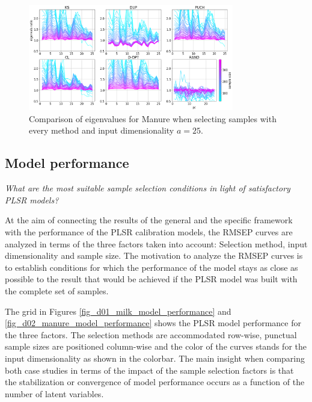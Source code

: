 \documentclass[journal=ancham,manuscript=article]{achemso}
\begin{document}
\begin{figure}[b]
\includegraphics[width=0.8\textwidth]{manuscript/figures/d02_manure_specific_framework_eigenvalsratio.png}
\centering
\caption{Comparison of eigenvalues for Manure when selecting samples with every method and input dimensionality $a=25$.}
\label{fig_d02_manure_specific_framework_eigenvalsratio}
\end{figure}

\subsection*{Model performance}\label{results:modperformance}


\emph{What are the most suitable sample selection conditions in light of satisfactory PLSR models?}

At the aim of connecting the results of the general and the specific framework with the performance of the PLSR calibration models, the RMSEP curves are analyzed in terms of the three factors taken into account: Selection method, input dimensionality and sample size. The motivation to analyze the RMSEP curves is to establish conditions for which the performance of the model stays as close as possible to the result that would be achieved if the PLSR model was built with the complete set of samples. 

The grid in Figures \ref{fig_d01_milk_model_performance} and \ref{fig_d02_manure_model_performance} shows the PLSR model performance for the three factors. The selection methods are accommodated row-wise, punctual sample sizes are positioned column-wise and the color of the curves stands for the input dimensionality as shown in the colorbar. The main insight when comparing both case studies in terms of the impact of the sample selection factors is that the stabilization or convergence of model performance occurs as a function of the number of latent variables. 
\end{document}
